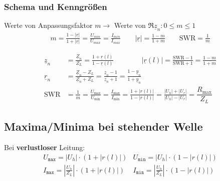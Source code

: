 \subsubsection{Schema und Kenngrößen}
\begin{center}
	
\end{center}

Werte von Anpassungsfaktor $ m \rightarrow$ Werte von
$ \Re{\underline{z}_n}: 0 \leq m \leq1 $
\begin{align*}
	m =\frac{1-|\underline{r}|}{1+|\underline{r}|} = \frac{U_{min}}{U_{max}} = \frac{I_{min}}{I_{max}} \qquad  |\underline{r}| = \frac{1-m}{1+m} \qquad \text{SWR}=\frac{1}{m}
\end{align*}

\begin{align*}
	\underline{z}_n & = \frac{\underline{Z}_n}{Z_L} = \frac{1+\underline{r}(l)}{1-\underline{r}(l)} \qquad \qquad |\underline{r}(l)|=\frac{\mathrm{SWR}-1}{\mathrm{SWR}+1} = \frac{1-m}{1+m}                   \\
	\underline{r}_n & = \frac{\underline{Z}_n-Z_L}{\underline{Z}_n+Z_L}= \frac{\underline{z}_n-1}{\underline{z}_n+1}    = \frac{1-\underline{y}_n}{1+\underline{y}_n}                                  \\
	\mathrm{SWR}    & = \frac{1}{m} = \frac{U_\text{max}}{U_\text{min}} = \frac{I_\text{max}}{I_\text{min}} = \frac{1+|r(l)|}{1-|r(l)|} = \frac{|U_h|+|U_r|}{|U_h|-|U_r|}= \dfrac{R_{\text{max}}}{Z_L}
\end{align*}

\subsection{Maxima/Minima bei stehender Welle}\label{sec:max_min_stehende_welle}
Bei \textbf{verlustloser} Leitung:
\begin{align*}
	 & U_{\texttt{max}} = |U_h| \cdot (1+|r(l)|)                            & U_{\texttt{min}} = |U_h| \cdot (1-|r(l)|)                           & \\
	 & I_{\texttt{max}} = \left | \frac{U_h}{Z_L} \right | \cdot (1+|r(l)|) & I_{\texttt{min}} = \left| \frac{U_h}{Z_L} \right | \cdot (1-|r(l)|) &
\end{align*}

